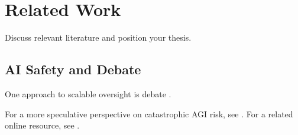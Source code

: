 \chapter{Related Work}

Discuss relevant literature and position your thesis.

\section{AI Safety and Debate}
One approach to scalable oversight is debate \cite{irving2018ai-safety-via-debate}.

For a more speculative perspective on catastrophic AGI risk, see \cite{possessedmachines2026agi}.
For a related online resource, see \cite{fatebook2026}.

